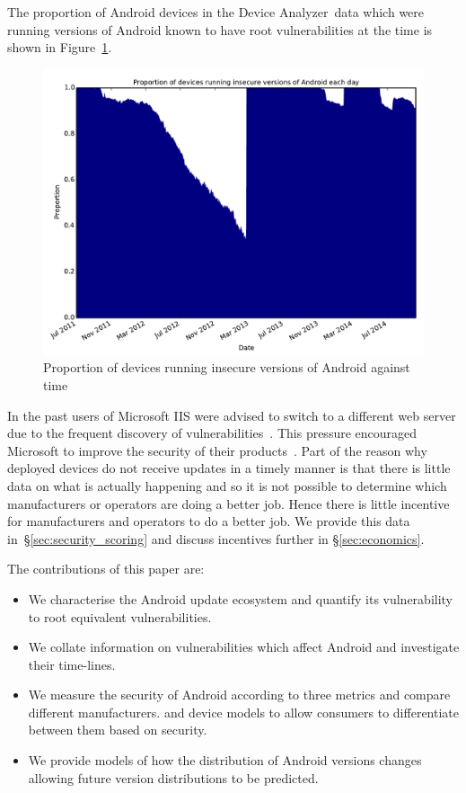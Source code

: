\documentclass[conference,a4paper,twoside]{IEEEtran}
\newcommand{\da}{Device Analyzer}
\begin{document}
The proportion of Android devices in the \da\ data which were running versions of Android known to have root vulnerabilities at the time is shown in Figure~\ref{fig:proportioninsecure}.

\begin{figure}[!b]
\centering
\includegraphics[width=\columnwidth]{figures/proportioninsecure}
\caption{Proportion of devices running insecure versions of Android against time}
\label{fig:proportioninsecure}
\end{figure}

In the past users of Microsoft IIS were advised to switch to a different web server due to the frequent discovery of vulnerabilities~\cite{Pescatore2001}.
This pressure encouraged Microsoft to improve the security of their products~\cite{TODO}.
Part of the reason why deployed devices do not receive updates in a timely manner is that there is little data on what is actually happening and so it is not possible to determine which manufacturers or operators are doing a better job.
Hence there is little incentive for manufacturers and operators to do a better job.
We provide this data  in~\S\ref{sec:security_scoring} and discuss incentives further in \S\ref{sec:economics}.

The contributions of this paper are:
\begin{itemize}
 \item We characterise the Android update ecosystem and quantify its vulnerability to root equivalent vulnerabilities.
 \item We collate information on vulnerabilities which affect Android and investigate their time-lines.
 \item We measure the security of Android according to three metrics and compare different manufacturers. and device models to allow consumers to differentiate between them based on security.
 \item We provide models of how the distribution of Android versions changes allowing future version distributions to be predicted.
\end{itemize}
\end{document}
